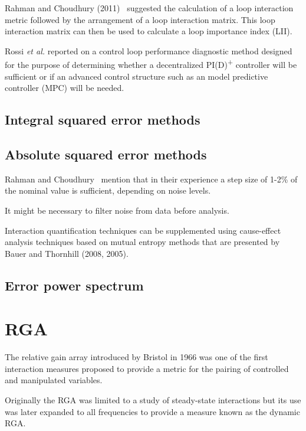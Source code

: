\documentclass[a4paper]{book}
\begin{document}
Rahman and Choudhury (2011)~\cite{Rahmann2011} %
suggested the calculation of a loop interaction metric followed by the arrangement of a loop interaction matrix.
This loop interaction matrix can then be used to calculate a loop importance index (LII).

Rossi \textit{et al.} reported on a control loop performance diagnostic method designed for the purpose of determining whether a decentralized PI(D)\textsuperscript{+} controller will be sufficient or if an advanced control structure such as an model predictive controller (MPC) will be needed.



\subsection{Integral squared error methods}



\subsection{Absolute squared error methods}

Rahman and Choudhury~\cite{Rahman2011} mention that in their experience a step size of 1-2\% of the nominal value is sufficient, depending on noise levels.

It might be necessary to filter noise from data before analysis.



Interaction quantification techniques can be supplemented using cause-effect analysis techniques based on mutual entropy methods that are presented by Bauer and Thornhill (2008, 2005).

\subsection{Error power spectrum}



\section{RGA}

The relative gain array introduced by Bristol in 1966 %
was one of the first interaction measures proposed to provide a metric for the pairing of controlled and manipulated variables.

Originally the RGA was limited to a study of steady-state interactions but its use was later expanded to all frequencies to provide a measure known as the dynamic RGA. %
\end{document}
